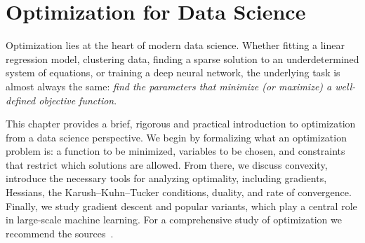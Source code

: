 
\chapter{Optimization for Data Science}
\label{c:optimization}

\newcommand{\dom}{{\mathcal D}}
\newcommand{\feas}{{\mathcal F}}
\newcommand{\finf}{{f_{\inf}}}
\newcommand{\loss}{{\mathcal C}}
\newcommand{\cost}{{\mathcal C}}
\newcommand{\PL}{{Polyak-\L ojasiewicz}}
\newcommand{\PLC}{{Polyak-\L ojasiewicz\ condition}}

Optimization lies at the heart of modern data science. Whether fitting a linear regression model, clustering data, finding a sparse solution to an underdetermined system of equations, or training a deep neural network, the underlying task is almost always the same: {\em find the parameters that minimize (or maximize) a well-defined objective function}. 

This chapter provides a brief, rigorous and practical introduction to optimization from a data science perspective. We begin by formalizing what an optimization problem is: a function to be minimized, variables to be chosen, and constraints that restrict which solutions are allowed. From there, we discuss convexity,   
introduce the necessary tools for analyzing optimality, including gradients, Hessians, the Karush–Kuhn–Tucker conditions, duality, and rate of convergence. Finally, we study gradient descent and popular variants, which play a central role in large-scale machine learning. For a comprehensive study of optimization we recommend the sources~\cite{LVanderberghe_SBoyd_book,calafiore2014optimization,nesterov2013introductory,nocedal2006numerical}.



